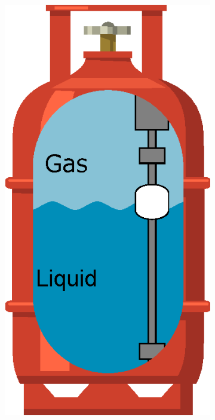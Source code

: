 \begin{figure}[]
    \centering
    \begin{subfigure}{0.15\textwidth}
        \centering
        \includegraphics[width=\linewidth]{Chapters/2CHP/Diagrams/bottleBasefluctuator.eps}

\end{subfigure}
\end{figure}
